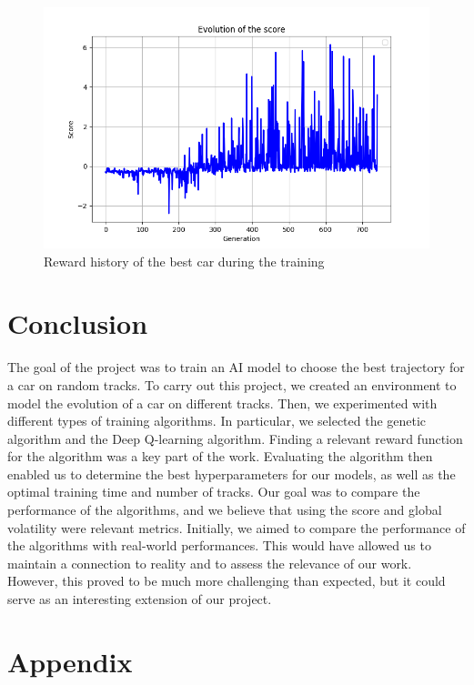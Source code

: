 \documentclass[11pt,a4paper]{article}
\newcounter{fig}
\begin{document}
        \begin{figure}[h]
            \centering
            \includegraphics[scale=0.6]{reward best car.png}
            \caption{Reward history of the best car during the training}
            \label{figure:Best_car_reward}
        \end{figure}

    
    \section*{Conclusion}

The goal of the project was to train an AI model to choose the best trajectory for a car on random tracks. To carry out this project, we created an environment to model the evolution of a car on different tracks. Then, we experimented with different types of training algorithms. In particular, we selected the genetic algorithm and the Deep Q-learning algorithm.
Finding a relevant reward function for the algorithm was a key part of the work. Evaluating the algorithm then enabled us to determine the best hyperparameters for our models, as well as the optimal training time and number of tracks. Our goal was to compare the performance of the algorithms, and we believe that using the score and global volatility were relevant metrics.
Initially, we aimed to compare the performance of the algorithms with real-world performances. This would have allowed us to maintain a connection to reality and to assess the relevance of our work. However, this proved to be much more challenging than expected, but it could serve as an interesting extension of our project.



\newpage
\section*{Appendix}
\end{document}
